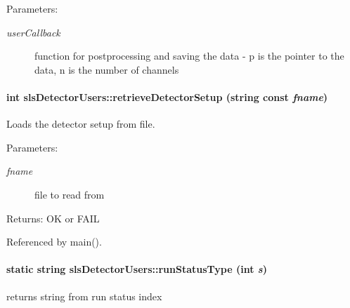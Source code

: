 \begin{Desc}
\item[Parameters:]
\begin{description}
\item[{\em user\-Callback}]function for postprocessing and saving the data - p is the pointer to the data, n is the number of channels \end{description}
\end{Desc}
\hypertarget{classslsDetectorUsers_8769c8ea5020b43dc3557c86f9e4159b}{
\paragraph[retrieveDetectorSetup]{\setlength{\rightskip}{0pt plus 5cm}int sls\-Detector\-Users::retrieve\-Detector\-Setup (string const  {\em fname})}\hfill}
\label{classslsDetectorUsers_8769c8ea5020b43dc3557c86f9e4159b}


Loads the detector setup from file. 

\begin{Desc}
\item[Parameters:]
\begin{description}
\item[{\em fname}]file to read from \end{description}
\end{Desc}
\begin{Desc}
\item[Returns:]OK or FAIL \end{Desc}


Referenced by main().\hypertarget{classslsDetectorUsers_2c073513ae3ac53f3e040bc2911b6ee2}{
\paragraph[runStatusType]{\setlength{\rightskip}{0pt plus 5cm}static string sls\-Detector\-Users::run\-Status\-Type (int {\em s})}\hfill}
\label{classslsDetectorUsers_2c073513ae3ac53f3e040bc2911b6ee2}


returns string from run status index 

